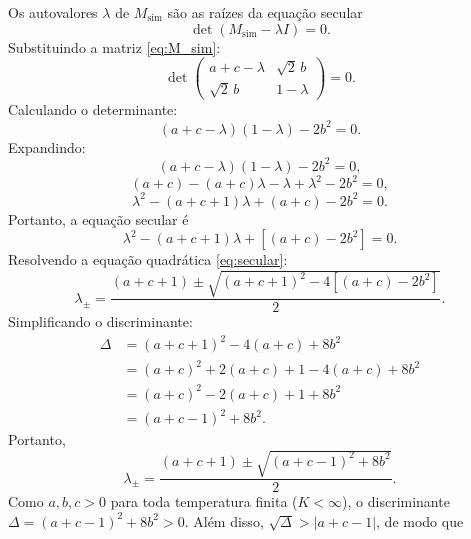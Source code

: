 \documentclass[11pt,a4paper]{article}
\begin{document}
%
Os autovalores \(\lambda\) de \(M_{\text{sim}}\) são as raízes da equação secular
%
\begin{equation}
    \det\left( M_{\text{sim}} - \lambda I \right) = 0.
\end{equation}
%
Substituindo a matriz \eqref{eq:M_sim}:
%
\begin{equation}
    \det
    \begin{pmatrix}
        a + c - \lambda & \sqrt{2}\, b \\
        \sqrt{2}\, b & 1 - \lambda
    \end{pmatrix}
    = 0.
\end{equation}
%
Calculando o determinante:
%
\begin{equation}
    (a + c - \lambda)(1 - \lambda) - 2b^2 = 0.
\end{equation}
%
Expandindo:
%
\begin{equation}
    (a + c - \lambda)(1 - \lambda) - 2b^2 = 0,
\end{equation}
%
\begin{equation}
    (a + c) - (a + c)\lambda - \lambda + \lambda^2 - 2b^2 = 0,
\end{equation}
%
\begin{equation}
    \lambda^2 - (a + c + 1)\lambda + (a + c) - 2b^2 = 0.
\end{equation}
%
Portanto, a equação secular é
%
\begin{equation}
    \boxed{
    \lambda^2 - (a + c + 1)\lambda + \left[ (a + c) - 2b^2 \right] = 0.
    }
    \label{eq:secular}
\end{equation}
%
Resolvendo a equação quadrática \eqref{eq:secular}:
%
\begin{equation}
    \lambda_{\pm} = \frac{(a + c + 1) \pm \sqrt{(a + c + 1)^2 - 4\left[ (a + c) - 2b^2 \right]}}{2}.
\end{equation}
%
Simplificando o discriminante:
%
\begin{align}
    \Delta &= (a + c + 1)^2 - 4(a + c) + 8b^2 \\
    &= (a + c)^2 + 2(a + c) + 1 - 4(a + c) + 8b^2 \\
    &= (a + c)^2 - 2(a + c) + 1 + 8b^2 \\
    &= (a + c - 1)^2 + 8b^2.
\end{align}
%
Portanto,
%
\begin{equation}
    \boxed{
    \lambda_{\pm} = \frac{(a + c + 1) \pm \sqrt{(a + c - 1)^2 + 8b^2}}{2}.
    }
    \label{eq:autovalores_simetricos}
\end{equation}
%
Como \(a, b, c > 0\) para toda temperatura finita (\(K < \infty\)), o discriminante \(\Delta = (a+c-1)^2 + 8b^2 > 0\). Além disso, \(\sqrt{\Delta} > |a+c-1|\), de modo que
\end{document}
